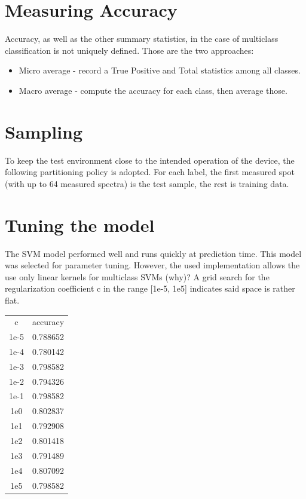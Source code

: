 \documentclass{article}
\begin{document}
\section{Measuring Accuracy}
Accuracy, as well as the other summary statistics, in the case of multiclass classification is not uniquely defined.
Those are the two approaches:
\begin{itemize}
\item{Micro average - record a True Positive and Total statistics among all classes. }
\item{Macro average - compute the accuracy for each class, then average those.}
\end{itemize}


\section{Sampling}
To keep the test environment close to the intended operation of the device, the following partitioning policy is adopted.
For each label, the first measured spot (with up to 64 measured spectra) is the test sample, the rest is training data.


\section{Tuning the model}
The SVM model performed well and runs quickly at prediction time.
This model was selected for parameter tuning.
However, the used implementation allows the use only linear kernels for multiclass SVMs (why)?
A grid search for the regularization coefficient c in the range [1e-5, 1e5] indicates said space is rather flat.

\begin{tabular}{ c | c }
c & accuracy  \\
1e-5 & 0.788652  \\
1e-4 & 0.780142  \\
1e-3 & 0.798582  \\
1e-2 & 0.794326  \\
1e-1 & 0.798582  \\
1e0 & 0.802837  \\
1e1 & 0.792908  \\
1e2 & 0.801418  \\
1e3 & 0.791489  \\
1e4 & 0.807092  \\
1e5 & 0.798582  \\
\end{tabular}
\end{document}
